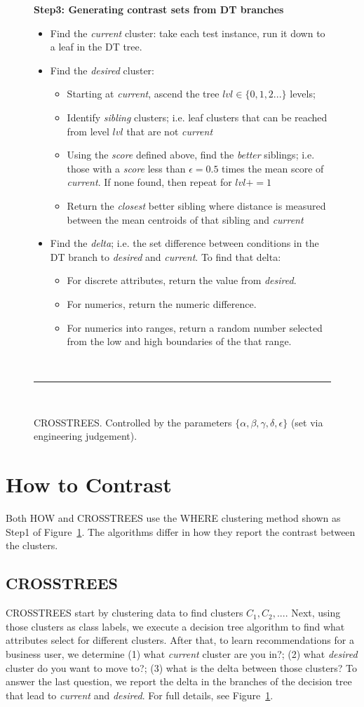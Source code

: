 \documentclass[conference]{IEEEtran}
\newcommand{\bi}{\begin{itemize}}
\newcommand{\ei}{\end{itemize}}
\newcommand{\fig}[1]{Figure~\ref{fig:#1}}
\begin{document}
\begin{figure}[t]
		{\bf Step3: Generating contrast sets from DT branches}
		\begin{itemize}
		\item Find the {\em current } cluster: take each test instance, run it down to a leaf in the DT tree.  
		\item Find the {\em desired} cluster: 
		\bi
		\item Starting at {\em current}, ascend the tree $lvl\in \{0,1,2...\}$ levels;
		\item Identify {\em sibling} clusters; i.e. leaf clusters that can be reached from level $lvl$ that are not {\em current }
		\item Using the {\em score} defined above, find the {\em better} siblings; i.e. those with a {\em score} less than $\epsilon=0.5$ times the mean score of {\em current}. If none found, then repeat for $lvl += 1$
		\item  Return the {\em closest} better sibling where distance is measured between the mean centroids of that sibling and {\em current}
		\ei
		\item Find the {\em delta}; i.e. the set difference between  conditions in the DT branch to {\em desired} and {\em current}. To find that delta:
		\bi
		\item
		For discrete attributes,  return the value from {\em desired}. 
		\item
		For  numerics, return the numeric difference. 
		\item
		For numerics  into ranges, return a random number selected from the low and high boundaries of the that range.
	\ei
	\ei
		~\hrule~
		\caption{CROSSTREES. Controlled by the parameters
		$\{\alpha, \beta, \gamma, \delta, \epsilon\}$ (set via engineering judgement).}
		\label{fig:contast_trees}
	\end{figure}
	
	\section{How to Contrast}
Both HOW and CROSSTREES use the WHERE clustering method shown as Step1 of \fig{contast_trees}. The algorithms differ in how they report the contrast between the clusters.
	
		\subsection{ CROSSTREES}

	CROSSTREES start by clustering data to find clusters $C_1,C_2,...$.
	Next, using those clusters as class labels, we execute a decision tree algorithm to find what attributes select for different clusters. After that, to learn recommendations for a business user, we determine (1) what {\em current} cluster are you in?; (2) what {\em desired} cluster do you want to move to?; (3) what is the delta between those clusters? To answer the last question, we report the delta in the branches of the decision tree that lead to {\em current} and {\em desired}.  For full details, see \fig{contast_trees}.
	
\end{document}
